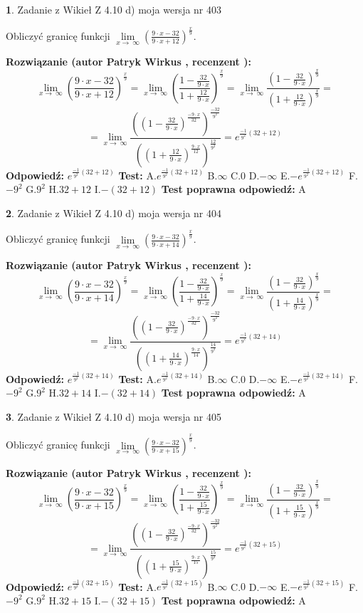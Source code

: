 \documentclass[12pt, a4paper]{article}
\theoremstyle{definition} %
\newtheorem{zad}{}
\newcommand{\zadStart}[1]{\begin{zad}#1\newline}
\newcommand{\zadStop}{\end{zad}}
\newcommand{\rozwStart}[2]{\noindent \textbf{Rozwiązanie (autor #1 , recenzent #2): }\newline}
\newcommand{\rozwStop}{\newline}
\newcommand{\odpStart}{\noindent \textbf{Odpowiedź:}\newline}
\newcommand{\odpStop}{\newline}
\newcommand{\testStart}{\noindent \textbf{Test:}\newline}
\newcommand{\testStop}{\newline}
\newcommand{\kluczStart}{\noindent \textbf{Test poprawna odpowiedź:}\newline}
\newcommand{\kluczStop}{\newline}
\begin{document}
\zadStart{Zadanie z Wikieł Z 4.10 d) moja wersja nr 403}


Obliczyć granicę funkcji  $\lim\limits_{x\to\ \infty}(\frac{9\cdot x-32}{9\cdot x+12})^{\frac{x}{9}}$.
\zadStop
\rozwStart{Patryk Wirkus}{}
$$\lim\limits_{x\to\ \infty}(\frac{9\cdot x-32}{9\cdot x+12})^{\frac{x}{9}} = \lim\limits_{x\to\ \infty}(\frac{1-\frac{32}{9\cdot x}}{1+\frac{12}{9\cdot x}})^{\frac{x}{9}}=\lim\limits_{x\to\ \infty}\frac{(1-\frac{32}{9\cdot x})^{\frac{x}{9}}}{(1+\frac{12}{9\cdot x})^{\frac{x}{9}}}=$$
$$=\lim\limits_{x\to\ \infty}\frac{((1-\frac{32}{9\cdot x})^{\frac{-9\cdot x}{32}})^{\frac{-32}{9^{2}}}}{((1+\frac{12}{9\cdot x})^{\frac{9\cdot x}{12}})^{\frac{12}{9^{2}}}}=e^{\frac{-1}{9^{2}}(32+12)}$$
\rozwStop
\odpStart
$e^{\frac{-1}{9^{2}}(32+12)}$
\odpStop
\testStart
A.$e^{\frac{-1}{9^{2}}(32+12)}$ B.$\infty$ C.$0$ D.$-\infty$ E.$-e^{\frac{-1}{9^{2}}(32+12)}$
F.$-9^{2}$ G.$9^{2}$
H.$32+12$
I.$-(32+12)$
\testStop
\kluczStart
A
\kluczStop



\zadStart{Zadanie z Wikieł Z 4.10 d) moja wersja nr 404}


Obliczyć granicę funkcji  $\lim\limits_{x\to\ \infty}(\frac{9\cdot x-32}{9\cdot x+14})^{\frac{x}{9}}$.
\zadStop
\rozwStart{Patryk Wirkus}{}
$$\lim\limits_{x\to\ \infty}(\frac{9\cdot x-32}{9\cdot x+14})^{\frac{x}{9}} = \lim\limits_{x\to\ \infty}(\frac{1-\frac{32}{9\cdot x}}{1+\frac{14}{9\cdot x}})^{\frac{x}{9}}=\lim\limits_{x\to\ \infty}\frac{(1-\frac{32}{9\cdot x})^{\frac{x}{9}}}{(1+\frac{14}{9\cdot x})^{\frac{x}{9}}}=$$
$$=\lim\limits_{x\to\ \infty}\frac{((1-\frac{32}{9\cdot x})^{\frac{-9\cdot x}{32}})^{\frac{-32}{9^{2}}}}{((1+\frac{14}{9\cdot x})^{\frac{9\cdot x}{14}})^{\frac{14}{9^{2}}}}=e^{\frac{-1}{9^{2}}(32+14)}$$
\rozwStop
\odpStart
$e^{\frac{-1}{9^{2}}(32+14)}$
\odpStop
\testStart
A.$e^{\frac{-1}{9^{2}}(32+14)}$ B.$\infty$ C.$0$ D.$-\infty$ E.$-e^{\frac{-1}{9^{2}}(32+14)}$
F.$-9^{2}$ G.$9^{2}$
H.$32+14$
I.$-(32+14)$
\testStop
\kluczStart
A
\kluczStop



\zadStart{Zadanie z Wikieł Z 4.10 d) moja wersja nr 405}


Obliczyć granicę funkcji  $\lim\limits_{x\to\ \infty}(\frac{9\cdot x-32}{9\cdot x+15})^{\frac{x}{9}}$.
\zadStop
\rozwStart{Patryk Wirkus}{}
$$\lim\limits_{x\to\ \infty}(\frac{9\cdot x-32}{9\cdot x+15})^{\frac{x}{9}} = \lim\limits_{x\to\ \infty}(\frac{1-\frac{32}{9\cdot x}}{1+\frac{15}{9\cdot x}})^{\frac{x}{9}}=\lim\limits_{x\to\ \infty}\frac{(1-\frac{32}{9\cdot x})^{\frac{x}{9}}}{(1+\frac{15}{9\cdot x})^{\frac{x}{9}}}=$$
$$=\lim\limits_{x\to\ \infty}\frac{((1-\frac{32}{9\cdot x})^{\frac{-9\cdot x}{32}})^{\frac{-32}{9^{2}}}}{((1+\frac{15}{9\cdot x})^{\frac{9\cdot x}{15}})^{\frac{15}{9^{2}}}}=e^{\frac{-1}{9^{2}}(32+15)}$$
\rozwStop
\odpStart
$e^{\frac{-1}{9^{2}}(32+15)}$
\odpStop
\testStart
A.$e^{\frac{-1}{9^{2}}(32+15)}$ B.$\infty$ C.$0$ D.$-\infty$ E.$-e^{\frac{-1}{9^{2}}(32+15)}$
F.$-9^{2}$ G.$9^{2}$
H.$32+15$
I.$-(32+15)$
\testStop
\kluczStart
A
\kluczStop
\end{document}

